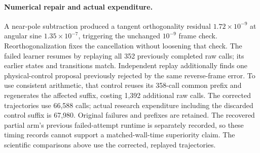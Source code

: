 \paragraph{Numerical repair and actual expenditure.}
A near-pole subtraction produced a tangent orthogonality residual
$1.72\times10^{-9}$ at angular sine $1.35\times10^{-7}$, triggering the unchanged
$10^{-9}$ frame check. Reorthogonalization fixes the cancellation without loosening
that check. The failed learner resumes by replaying all 352 previously completed
raw calls; its earlier states and transitions match. Independent replay additionally
finds one physical-control proposal previously rejected by the same reverse-frame
error. To use consistent arithmetic, that control reuses its 358-call common
prefix and regenerates the affected suffix, costing 1,392 additional raw calls.
The corrected trajectories use 66,588 calls; actual research expenditure including
the discarded control suffix is 67,980. Original failures and prefixes are retained.
The recovered partial arm's previous failed-attempt runtime is separately recorded,
so these timing records cannot support a matched-wall-time superiority claim.
The scientific comparisons above use the corrected, replayed trajectories.

